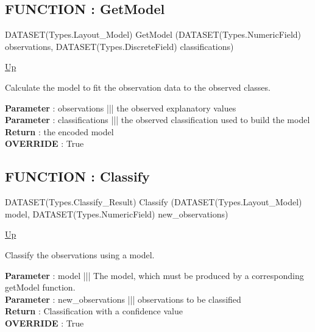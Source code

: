 \subsection*{FUNCTION : GetModel}
\hypertarget{ecldoc:logisticregression.binomiallogisticregression.getmodel}{}
\begin{minipage}[t]{\textwidth}
\begin{flushleft}
DATASET(Types.Layout\_Model) GetModel (DATASET(Types.NumericField) observations, DATASET(Types.DiscreteField) classifications)
\end{flushleft}
\end{minipage}
\hyperlink{ecldoc:logisticregression.binomiallogisticregression}{Up}

\par
Calculate the model to fit the observation data to the observed classes.
\par
\textbf{Parameter} : observations ||| the observed explanatory values \\
\textbf{Parameter} : classifications ||| the observed classification used to build the model \\
\textbf{Return} : the encoded model \\
\textbf{OVERRIDE} : True \\
\subsection*{FUNCTION : Classify}
\hypertarget{ecldoc:logisticregression.binomiallogisticregression.classify}{}
\begin{minipage}[t]{\textwidth}
\begin{flushleft}
DATASET(Types.Classify\_Result) Classify (DATASET(Types.Layout\_Model) model, DATASET(Types.NumericField) new\_observations)
\end{flushleft}
\end{minipage}
\hyperlink{ecldoc:logisticregression.binomiallogisticregression}{Up}

\par
Classify the observations using a model.
\par
\textbf{Parameter} : model ||| The model, which must be produced by a corresponding getModel function. \\
\textbf{Parameter} : new\_observations ||| observations to be classified \\
\textbf{Return} : Classification with a confidence value \\
\textbf{OVERRIDE} : True \\
